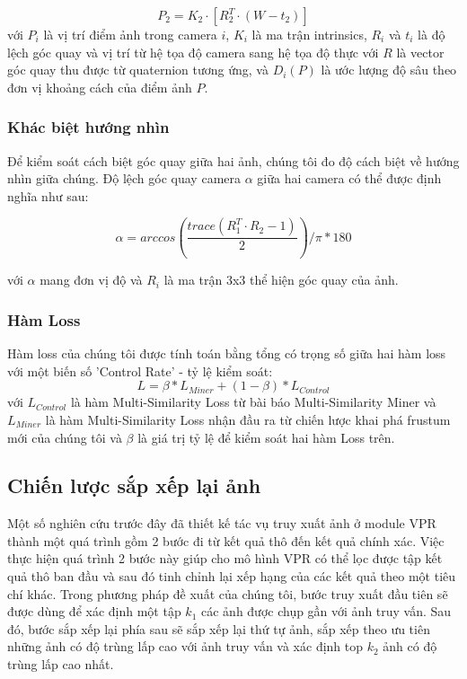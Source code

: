 $$
P_2 = K_2 \cdot\left[R_2^{T} \cdot (W - t_2)\right]
$$
với $P_i$ là vị trí điểm ảnh trong camera $i$, $K_i$ là ma trận intrinsics, $R_i$ và $t_i$ là độ lệch góc quay và vị trí từ hệ tọa độ camera sang hệ tọa độ thực với $R$ là vector góc quay thu được từ quaternion tương ứng, và $D_i(P)$ là ước lượng độ sâu theo đơn vị khoảng cách của điểm ảnh $P$.

\subsubsection*{Khác biệt hướng nhìn}

Để kiểm soát cách biệt góc quay giữa hai ảnh, chúng tôi đo độ cách biệt về hướng nhìn giữa chúng. Độ lệch góc quay camera $\alpha$ giữa hai camera có thể được định nghĩa như sau:

$$
\alpha = arccos\left(\frac{trace(R_1^T \cdot R_2 - 1)}{2} \right) / \pi * 180
$$

với $\alpha$ mang đơn vị độ và $R_i$ là ma trận 3x3 thể hiện góc quay của ảnh.

\subsubsection*{Hàm Loss}

Hàm loss của chúng tôi được tính toán bằng tổng có trọng số giữa hai hàm loss với một biến số 'Control Rate' - tỷ lệ kiểm soát:
$$
L = \beta * L_{Miner} + (1-\beta)*L_{Control}
$$
với $L_{Control}$ là hàm Multi-Similarity Loss từ bài báo Multi-Similarity Miner và $L_{Miner}$ là hàm Multi-Similarity Loss nhận đầu ra từ chiến lược khai phá frustum mới của chúng tôi và $\beta$ là giá trị tỷ lệ để kiểm soát hai hàm Loss trên.

\subsection{Chiến lược sắp xếp lại ảnh}
Một số nghiên cứu trước đây đã thiết kế tác vụ truy xuất ảnh ở module VPR thành một quá trình gồm 2 bước đi từ kết quả thô đến kết quả chính xác. Việc thực hiện quá trình 2 bước này giúp cho mô hình VPR có thể lọc được tập kết quả thô ban đầu và sau đó tinh chỉnh lại xếp hạng của các kết quả theo một tiêu chí khác. Trong phương pháp đề xuất của chúng tôi, bước truy xuất đầu tiên sẽ được dùng để xác định một tập $k_1$ các ảnh được chụp gần với ảnh truy vấn. Sau đó, bước sắp xếp lại phía sau sẽ sắp xếp lại thứ tự ảnh, sắp xếp theo ưu tiên những ảnh có độ trùng lấp cao với ảnh truy vấn và xác định top $k_2$ ảnh có độ trùng lấp cao nhất.

